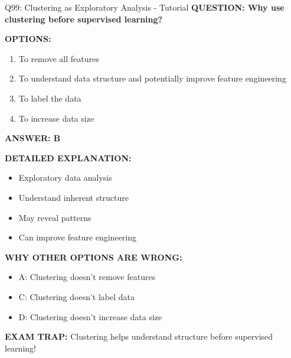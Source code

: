 \documentclass[8pt]{beamer}
\begin{document}
	\begin{frame}{Q99: Clustering as Exploratory Analysis - Tutorial}
		\fontsize{6.5}{7.5}\selectfont
		\textbf{QUESTION: Why use clustering before supervised learning?}
		
		\vspace{0.1cm}
		\textbf{OPTIONS:}
		\begin{enumerate}
			\item To remove all features
			\item To understand data structure and potentially improve feature engineering
			\item To label the data
			\item To increase data size
		\end{enumerate}
		
		\vspace{0.1cm}
		\textcolor{myblue}{\textbf{ANSWER: B}}
		
		\vspace{0.1cm}
		\textbf{DETAILED EXPLANATION:}
		\begin{itemize}
			\item Exploratory data analysis
			\item Understand inherent structure
			\item May reveal patterns
			\item Can improve feature engineering
		\end{itemize}
		
		\vspace{0.1cm}
		\textcolor{myred}{\textbf{WHY OTHER OPTIONS ARE WRONG:}}
		\begin{itemize}
			\item \textcolor{myred}{A:} Clustering doesn't remove features
			\item \textcolor{myred}{C:} Clustering doesn't label data
			\item \textcolor{myred}{D:} Clustering doesn't increase data size
		\end{itemize}
		
		\textcolor{myred}{\textbf{EXAM TRAP:}} Clustering helps \textcolor{myblue}{understand structure} before supervised learning!
	\end{frame}
	
\end{document}
